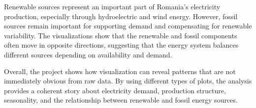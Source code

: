 \documentclass[conference]{IEEEtran}
\begin{document}
Renewable sources represent an important part of Romania's electricity production, especially through hydroelectric and wind energy. However, fossil sources remain important for supporting demand and compensating for renewable variability. The visualizations show that the renewable and fossil components often move in opposite directions, suggesting that the energy system balances different sources depending on availability and demand.

Overall, the project shows how visualization can reveal patterns that are not immediately obvious from raw data. By using different types of plots, the analysis provides a coherent story about electricity demand, production structure, seasonality, and the relationship between renewable and fossil energy sources.



\end{document}
